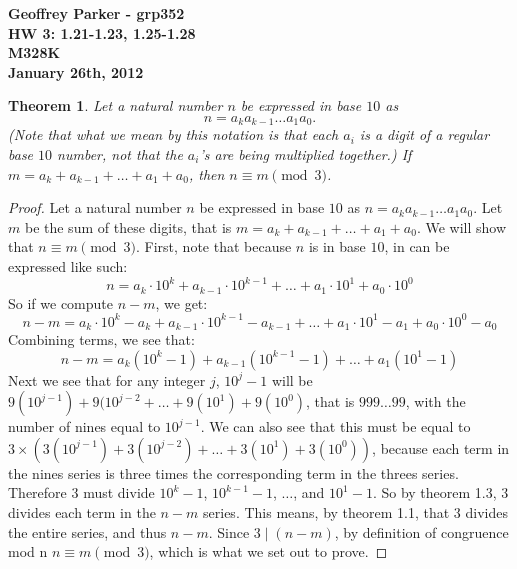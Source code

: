 \documentclass[12pt,leqno]{article}
\numberwithin{equation}{section}
\newtheorem{thm}{Theorem}[section]
\theoremstyle{definition}
\begin{document}
\thispagestyle{plain}
\begin{flushright}
\large{\textbf{Geoffrey Parker - grp352 \\
HW 3: 1.21-1.23, 1.25-1.28\\
M328K \\
January 26th, 2012 \\}}
\end{flushright}

\markboth{}{} \setcounter{section}{0} \baselineskip=18pt

\setcounter{tocdepth}{4}



\setcounter{section}{1}

\setcounter{thm}{20}
\begin{thm}
Let a natural number $n$ be expressed in base $10$ as \[n = a_k
a_{k-1} \hdots a_1 a_0.\]  (Note that what we mean by this notation
is that each $a_i$ is a digit of a regular base $10$ number, not
that the $a_i$'s are being multiplied together.) If $m = a_k +
a_{k-1} + \hdots + a_1 + a_0$, then $n \equiv m \pmod{3}$.
\end{thm}

\begin{proof}[Proof]
Let a natural number $n$ be expressed in base $10$ as $n = a_k a_{k-1} \hdots a_1 a_0$.  Let $m$ be the sum of these digits, that is $m = a_k + a_{k-1} + \hdots + a_1 + a_0$.  We will show that $n \equiv m \pmod{3}$.  First, note that because $n$ is in base $10$, in can be expressed like such: 
\[n = a_k \cdot 10^k + a_{k-1} \cdot 10^{k-1} + \hdots + a_1 \cdot 10^1 + a_0 \cdot 10^0\]  So if we compute $n - m$, we get: 
\[n - m = a_k \cdot 10^k - a_k + a_{k-1} \cdot 10^{k-1} - a_{k-1} + \hdots + a_1 \cdot 10^1 - a_1 + a_0 \cdot 10^0 - a_0\]
Combining terms, we see that:
\[n - m = a_k (10^k-1) + a_{k-1} (10^{k-1}-1) + \hdots + a_1 (10^1-1)\]
Next we see that for any integer $j$, $10^j-1$ will be $9(10^{j-1}) + 9(10^{j-2} + \hdots + 9(10^1) + 9(10^0)$, that is $999\ldots 99$, with the number of nines equal to $10^{j-1}$.  We can also see that this must be equal to $3 \times (3(10^{j-1}) + 3(10^{j-2}) + \hdots + 3(10^1) + 3(10^0))$, because each term in the nines series is three times the corresponding term in the threes series.  Therefore $3$ must divide $10^k-1$, $10^{k-1}-1$, $\ldots$, and $10^1-1$.  So by theorem 1.3, $3$ divides each term in the $n-m$ series.  This means, by theorem 1.1, that $3$ divides the entire series, and thus $n - m$.  Since $3 \mid (n - m)$, by definition of congruence mod n $n \equiv m \pmod{3}$, which is what we set out to prove.
\end{proof}
\end{document}
